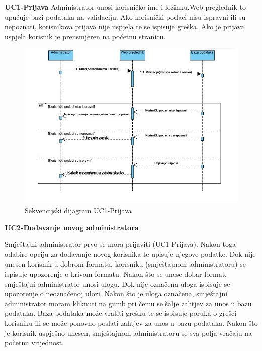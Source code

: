 				\textbf{UC1-Prijava}
				{Administrator unosi korisničko ime i lozinku.Web preglednik to upućuje bazi podataka na validaciju. Ako korisnički podaci nisu ispravni ili su nepoznati, korisnikova prijava nije uspjela te se ispisuje greška. Ako je prijava uspjela korisnik je preusmjeren na početnu stranicu.}
				
				\begin{figure}[H]
					\includegraphics[width=\linewidth]{slike/DentAll_Sekvencijski-UC1-Prijava.jpeg} 
					\centering
					\caption{Sekvencijski dijagram UC1-Prijava}
					\label{fig:Sekvencijski dijagram UC1}
				\end{figure}
				
				\newpage
				
					\textbf{UC2-Dodavanje novog administratora}
					
					{Smještajni administrator prvo se mora prijaviti (UC1-Prijava). Nakon toga odabire opciju za dodavanje novog korisnika te upisuje njegove podatke. Dok nije unesen korisnik u dobrom formatu, korisniku (smještajnom administratoru) se ispisuje upozorenje o krivom formatu. Nakon što se unese dobar format, smještajni administrator unosi ulogu. Dok nije označena uloga ispisuje se upozorenje o neoznačenoj ulozi. Nakon što je uloga označena, smještajni administrator moram kliknuti na gumb pri čemu se šalje zahtjev za unos u bazu podataka. Baza  podataka može vratiti grešku te se ispisuje poruka o grešci korisniku ili se može ponovno poslati zahtjev za unos u bazu podataka. Nakon što je korisnik uspješno unesen, smještajnom administratoru se sva polja vračaju na početnu vrijednost.}
				
